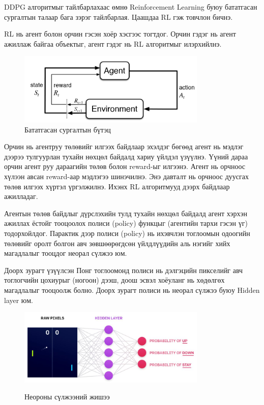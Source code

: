 \documentclass[12pt,A4]{report}
\begin{document}
DDPG алгоритмыг тайлбарлахаас өмнө Reinforcement Learning буюу бататгасан сургалтын талаар бага зэрэг тайлбарлая. Цаашдаа RL гэж товчлон бичнэ.

RL нь агент болон орчин гэсэн хоёр хэсгээс тогтдог. Орчин гэдэг нь агент ажиллаж байгаа объектыг, агент гэдэг нь RL алгоритмыг илэрхийлнэ.

\begin{figure}[H]
\centering
\includegraphics[width=0.8\textwidth]{./images/rl}
\caption{Бататгасан сургалтын бүтэц}
\end{figure}

Орчин нь агентруу төлөвийг илгээх байдлаар эхэлдэг бөгөөд агент нь мэдлэг дээрээ тулгуурлан тухайн нөхцөл байдалд хариу үйлдэл үзүүлнэ. Үүний дараа орчин агент руу дараагийн төлөв болон reward-ыг илгээнэ. Агент нь орчноос хүлээн авсан reward-аар мэдлэгээ шинэчилнэ. Энэ давталт нь орчноос дуусгах төлөв илгээх хүртэл үргэлжилнэ. Ихэнх RL алгоритмууд дээрх байдлаар ажилладаг.

Агентын төлөв байдлыг дүрслэхийн тулд тухайн нөхцөл байдалд агент хэрхэн ажиллах ёстойг тооцоолох полиси (policy) функцыг (агентийн тархи гэсэн үг) тодорхойлдог. Парактик дээр полиси (policy) нь ихэвчлэн тоглоомын одоогийн төлөвийг оролт болгон авч зөвшөөрөгдсөн үйлдлүүдийн аль нэгийг хийх магадлалыг тооцдог неорал сүлжээ юм.

Доорх зурагт үзүүлсэн Понг тоглоомонд полиси нь дэлгэцийн пикселийг авч тоглогчийн цохиурыг (ногоон) дээш, доош эсвэл хоёуланг нь хөдөлгөх магадлалыг тооцоолж болно. Доорх зурагт полиси нь неорал сүлжээ буюу Hidden layer юм.  

\begin{figure}[H]
\centering
\href{https://openai.com/content/images/2017/03/first-graphic-1.png}{\includegraphics[width=0.8\textwidth]{./images/neural_network}}
\caption{Неороны сүлжээний жишээ}
\end{figure}
\end{document}

